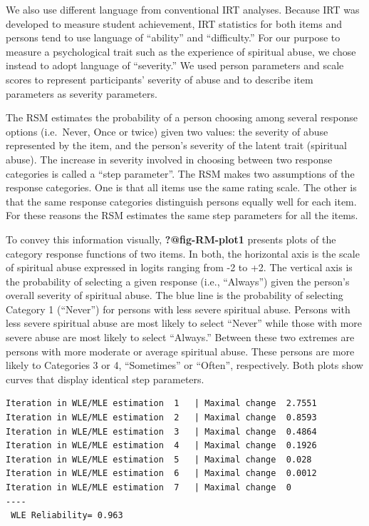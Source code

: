 \documentclass[
  letterpaper,
]{article}
\begin{document}
We also use different language from conventional IRT analyses. Because
IRT was developed to measure student achievement, IRT statistics for
both items and persons tend to use language of ``ability'' and
``difficulty.'' For our purpose to measure a psychological trait such as
the experience of spiritual abuse, we chose instead to adopt language of
``severity.'' We used person parameters and scale scores to represent
participants' severity of abuse and to describe item parameters as
severity parameters.

The RSM estimates the probability of a person choosing among several
response options (i.e.~Never, Once or twice) given two values: the
severity of abuse represented by the item, and the person's severity of
the latent trait (spiritual abuse). The increase in severity involved in
choosing between two response categories is called a ``step parameter''.
The RSM makes two assumptions of the response categories. One is that
all items use the same rating scale. The other is that the same response
categories distinguish persons equally well for each item. For these
reasons the RSM estimates the same step parameters for all the items.

To convey this information visually, \textbf{?@fig-RM-plot1} presents
plots of the category response functions of two items. In both, the
horizontal axis is the scale of spiritual abuse expressed in logits
ranging from -2 to +2. The vertical axis is the probability of selecting
a given response (i.e., ``Always'') given the person's overall severity
of spiritual abuse. The blue line is the probability of selecting
Category 1 (``Never'') for persons with less severe spiritual abuse.
Persons with less severe spiritual abuse are most likely to select
``Never'' while those with more severe abuse are most likely to select
``Always.'' Between these two extremes are persons with more moderate or
average spiritual abuse. These persons are more likely to Categories 3
or 4, ``Sometimes'' or ``Often'', respectively. Both plots show curves
that display identical step parameters.

\begin{verbatim}
Iteration in WLE/MLE estimation  1   | Maximal change  2.7551 
Iteration in WLE/MLE estimation  2   | Maximal change  0.8593 
Iteration in WLE/MLE estimation  3   | Maximal change  0.4864 
Iteration in WLE/MLE estimation  4   | Maximal change  0.1926 
Iteration in WLE/MLE estimation  5   | Maximal change  0.028 
Iteration in WLE/MLE estimation  6   | Maximal change  0.0012 
Iteration in WLE/MLE estimation  7   | Maximal change  0 
----
 WLE Reliability= 0.963 
\end{verbatim}
\end{document}
